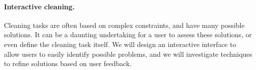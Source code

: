 \paragraph{Interactive cleaning.} %
\label{par:interactive_cleaning}
Cleaning tasks are often based on complex constraints, and have many possible
solutions. It can be a daunting undertaking for a user to assess these
solutions, or even define the cleaning task itself. We will design an
interactive interface to allow users to easily identify possible problems, and
we will investigate techniques to refine solutions based on user feedback.






